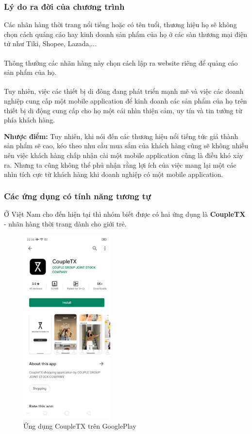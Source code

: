 \documentclass[12pt]{article}
\begin{document}
\subsubsection{Lý do ra đời của chương trình}
Các nhãn hàng thời trang nổi tiếng hoặc có tên tuổi, thương hiệu họ sẽ không chọn cách quảng cáo hay kinh doanh sản phẩm của họ ở các sàn thương mại điện tử như Tiki, Shopee, Lazada,...\\\\
\indent Thông thường các nhãn hàng này chọn cách lập ra website riêng để quảng cáo sản phẩm của họ.\\\\
\indent Tuy nhiên, việc các thiết bị di đông đang phát triển mạnh mẽ và việc các doanh nghiệp cung cấp một mobile application để kinh doanh các sản phẩm của họ trên thiết bị di động cung cấp cho họ một cái nhìn thiện cảm, uy tín và tin tưởng từ phía khách hàng.

\newpage
\indent \textbf{Nhược điểm:} Tuy nhiên, khi nói đến các thương hiệu nổi tiếng tức giá thành sản phẩm sẽ cao, kéo theo nhu cầu mua sắm của khách hàng cũng sẽ không nhiều nên việc khách hàng chấp nhận cài một mobile application cũng là điều khó xảy ra. Nhưng ta cũng không thể phủ nhận rằng lợi ích của việc mang lại một các nhìn tích cực từ khách hàng khi doanh nghiệp có một mobile application.

\subsubsection{Các ứng dụng có tính năng tương tự}
Ở Việt Nam cho đến hiện tại thì nhóm biết được có hai ứng dụng là \textbf{CoupleTX} - nhãn hàng thời trang dành cho giới trẻ.

\begin{figure}[H]
    \centering
    \includegraphics[height=10cm]{images/01.png}
    \caption{Ứng dụng CoupleTX trên GooglePlay}
\end{figure}
\end{document}
